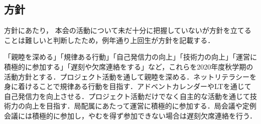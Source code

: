 \subsection*{\firstGrade{}方針}

\firstGrade{}方針にあたり，
本会の活動について未だ十分に把握していない\firstGrade{}が方針を立てることは難しいと判断したため，例年通り上回生が\firstGrade{}方針を記載する．

「親睦を深める」「規律ある行動」「自己発信力の向上」「技術力の向上」「運営に積極的に参加する」「遅刻や欠席連絡をする」など，これらを\firstGrade{}2020年度秋学期の活動方針とする．プロジェクト活動を通して親睦を深める．ネットリテラシーを身に着けることで規律ある行動を目指す．アドベントカレンダーやLTを通じて自己発信力を向上させる．プロジェクト活動だけでなく自主的な活動を通じて技術力の向上を目指す．局配属にあたって運営に積極的に参加する．局会議や定例会議には積極的に参加し，やむを得ず参加できない場合は遅刻欠席連絡を行う．
